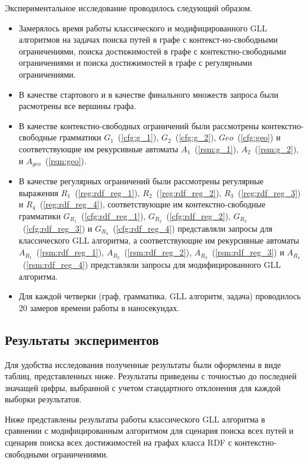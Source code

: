 Экспериментальное исследование проводилось следующий образом.
\begin{itemize}
    \item Замерялось время работы классического и модифицированного GLL алгоритмов на задачах поиска путей в графе с контекст-но-свободными ограничениями, поиска достижимостей в графе с контекстно-свободными ограничениями и поиска достижимостей в графе с регулярными ограничениями.
    \item В качестве стартового и в качестве финального множеств запроса были расмотрены все вершины графа.
    \item В качестве контекстно-свободных ограничений были рассмотрены контекстно-свободные грамматики $G_1$~(\ref{cfg:g_1}), $G_2$~(\ref{cfg:g_2}), $Geo$~(\ref{cfg:geo}) и соответствующие им рекурсивные автоматы $A_1$~(\ref{rsm:g_1}), $A_2$~(\ref{rsm:g_2}), и $A_{geo}$~(\ref{rsm:geo}).
    \item В качестве регулярных ограничений были рассмотрены регулярные выражения $R_1$~(\ref{reg:rdf_reg_1}), $R_2$~(\ref{reg:rdf_reg_2}), $R_3$~(\ref{reg:rdf_reg_3}) и $R_4$~(\ref{reg:rdf_reg_4}), соответствующие им контекстно-свободные грамматики $G_{R_1}$~(\ref{cfg:rdf_reg_1}), $G_{R_2}$~(\ref{cfg:rdf_reg_2}), $G_{R_3}$~(\ref{cfg:rdf_reg_3}) и $G_{R_4}$~(\ref{cfg:rdf_reg_4}) представляли запросы для классического GLL алгоритма, а соответствующие им рекурсивные автоматы $A_{R_1}$~(\ref{rsm:rdf_reg_1}), $A_{R_2}$~(\ref{rsm:rdf_reg_2}), $A_{R_3}$~(\ref{rsm:rdf_reg_3}) и $A_{R_4}$~(\ref{rsm:rdf_reg_4}) представляли запросы для модифицированного GLL алгоритма.
    \item Для каждой четверки (граф, грамматика, GLL алгоритм, задача) проводилось 20 замеров времени работы в наносекундах.
\end{itemize}

\subsection{Результаты экспериментов}

Для удобства исследования полученные результаты были оформлены в виде таблиц, представленных ниже.
Результаты приведены с точностью до последней значащей цифры, выбранной с учетом стандартного отклонения для каждой выборки результатов.

Ниже представлены результаты работы классического GLL алгоритма в сравнении с модифицированным алгоритмом для сценария поиска всех путей и сценария поиска всех достижимостей на графах класса RDF с контекстно-свободными ограничениями.


